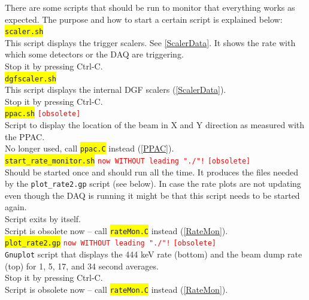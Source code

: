 \documentclass[10pt]{article}
\newcommand{\yellow}[1]{\colorbox{yellow}{\texttt{#1}}}
\newcommand{\redt}[1]{\textcolor{red}{\texttt{#1}}}
\begin{document}
There are some scripts that should be run to monitor that everything
works as expected.  The purpose and how to start a certain script is
explained below:\\

\yellow{scaler.sh}\\

This script displays the trigger scalers. See \ref{ScalerData}.
It shows the rate with which some detectors or the DAQ are triggering.\\
Stop it by pressing Ctrl-C. \\

\yellow{dgfscaler.sh}\\

This script displays the internal DGF scalers (\ref{ScalerData}).\\
Stop it by pressing Ctrl-C. \\

\yellow{ppac.sh}  \redt{[obsolete]}\\

Script to display the location of the beam in X and Y direction as measured
with the PPAC.\\
No longer used, call \yellow{ppac.C} instead (\ref{PPAC}).\\

\yellow{start\_rate\_monitor.sh} \redt{now WITHOUT leading "./"!} \redt{[obsolete]}\\

Should be started once and should run all the time.
It produces the files needed by the \texttt{plot\_rate2.gp} script (see below).
In case the rate plots are not updating even though the DAQ is running it
might be that this script needs to be started again.\\
Script exits by itself.\\
Script is obsolete now -- call \yellow{rateMon.C} instead (\ref{RateMon}).\\

\yellow{plot\_rate2.gp} \redt{now WITHOUT leading "./"!} \redt{[obsolete]}\\

\texttt{Gnuplot} script that displays the 444 keV rate (bottom) and the beam
dump rate (top) for 1, 5, 17, and 34 second averages.\\
Stop it by pressing Ctrl-C. \\ 
Script is obsolete now -- call \yellow{rateMon.C} instead (\ref{RateMon}).\\
\end{document}
